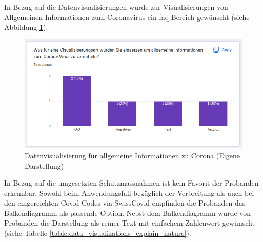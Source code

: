 \begin{table}[h]
\centering
{}
\caption{Interessenzrelevanz der Probanden für Unterkategorien des Bereichs ``Erklärung der Natur`` (Eigene Darstellung)}
\label{table:interest_subcategory_nature_of_pandemic}
\end{table}

In Bezug auf die Datenvisualisierungen wurde zur Visualisierungen von Allgemeinen Informationen zum Coronavirus ein \gls{faq} Bereich gewünscht (siehe Abbildung \ref{fig:online_formular_visualization_for_general_covid_information}).

 \begin{figure}[h]
    \includegraphics[width=14cm]{images/online_formular_visualization_for_general_covid_information.png}
    \centering
    \caption{Datenvisualisierung für allgemeine Informationen zu Corona (Eigene Darstellung)}
    \label{fig:online_formular_visualization_for_general_covid_information}
\end{figure}

\clearpage
In Bezug auf die umgesetzten Schutzmassnahmen ist kein Favorit der Probanden erkennbar. Sowohl beim Anwendungsfall bezüglich der Verbreitung als auch bei den eingereichten Covid Codes via SwissCovid empfinden die Probanden das Balkendiagramm als passende Option. Nebst dem Balkendiagramm wurde von Probanden die Darstellung als reiner Text mit einfachem Zahlenwert gewünscht (siehe Tabelle \ref{table:data_visualizations_explain_nature}).

